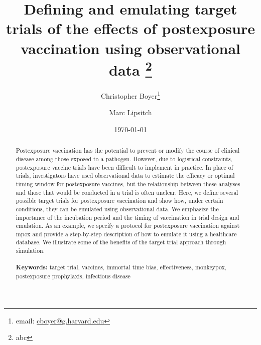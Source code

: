 \documentclass[11pt]{article}
\begin{document}
\begin{titlepage}
\title{Defining and emulating target trials of the effects of postexposure vaccination using observational data \thanks{abc}}
\author[1]{Christopher Boyer\thanks{email: \href{mailto:cboyer@g.harvard.edu}{cboyer@g.harvard.edu}}}
\author[1]{Marc Lipsitch}
\date{\today}
\maketitle

\begin{abstract}
Postexposure vaccination has the potential to prevent or modify the course of clinical disease among those exposed to a pathogen. However, due to logistical constraints, postexposure vaccine trials have been difficult to implement in practice. In place of trials, investigators have used observational data to estimate the efficacy or optimal timing window for postexposure vaccines, but the relationship between these analyses and those that would be conducted in a trial is often unclear. Here, we define several possible target trials for postexposure vaccination and show how, under certain conditions, they can be emulated using observational data. We emphasize the importance of the incubation period and the timing of vaccination in trial design and emulation. As an example, we specify a protocol for postexposure vaccination against mpox and provide a step-by-step description of how to emulate it using a healthcare database. We illustrate some of the benefits of the target trial approach through simulation.
\noindent \\
\vspace{0in} \\
\noindent\textbf{Keywords:} target trial, vaccines, immortal time bias, effectiveness, monkeypox, postexposure prophylaxis, infectious disease \\

\bigskip
\end{abstract}
\setcounter{page}{0}
\thispagestyle{empty}
\end{titlepage}
\pagebreak \newpage

\doublespacing
\end{document}
